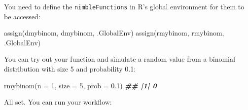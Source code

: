 \documentclass[
  12pt,
]{krantz}
\newenvironment{Shaded}{\begin{snugshade}}{\end{snugshade}}
\newcommand{\AttributeTok}[1]{\textcolor[rgb]{0.77,0.63,0.00}{#1}}
\newcommand{\DecValTok}[1]{\textcolor[rgb]{0.00,0.00,0.81}{#1}}
\newcommand{\DocumentationTok}[1]{\textcolor[rgb]{0.56,0.35,0.01}{\textbf{\textit{#1}}}}
\newcommand{\FloatTok}[1]{\textcolor[rgb]{0.00,0.00,0.81}{#1}}
\newcommand{\FunctionTok}[1]{\textcolor[rgb]{0.00,0.00,0.00}{#1}}
\newcommand{\NormalTok}[1]{#1}
\newcommand{\StringTok}[1]{\textcolor[rgb]{0.31,0.60,0.02}{#1}}
\begin{document}
You need to define the \texttt{nimbleFunctions} in R's global environment for them to be accessed:

\begin{Shaded}
\begin{Highlighting}[]
\FunctionTok{assign}\NormalTok{(}\StringTok{\textquotesingle{}dmybinom\textquotesingle{}}\NormalTok{, dmybinom, .GlobalEnv)}
\FunctionTok{assign}\NormalTok{(}\StringTok{\textquotesingle{}rmybinom\textquotesingle{}}\NormalTok{, rmybinom, .GlobalEnv)}
\end{Highlighting}
\end{Shaded}

You can try out your function and simulate a random value from a binomial distribution with size 5 and probability 0.1:

\begin{Shaded}
\begin{Highlighting}[]
\FunctionTok{rmybinom}\NormalTok{(}\AttributeTok{n =} \DecValTok{1}\NormalTok{, }\AttributeTok{size =} \DecValTok{5}\NormalTok{, }\AttributeTok{prob =} \FloatTok{0.1}\NormalTok{)}
\DocumentationTok{\#\# [1] 0}
\end{Highlighting}
\end{Shaded}

All set. You can run your workflow:
\end{document}
